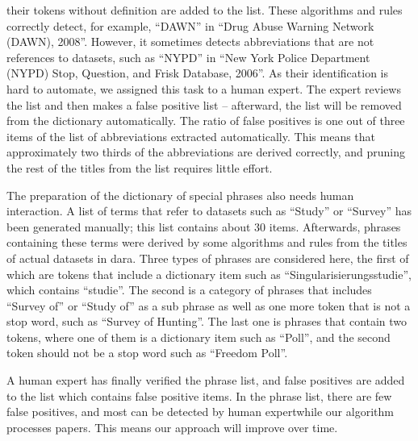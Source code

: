 \documentclass{IOS-Book-Article}
\newcommand{\dara}{\textsf{da\textbar ra}}
\begin{document}
their tokens without definition are added to the list.
These algorithms and rules correctly detect, for example, \enquote{DAWN} in \enquote{Drug Abuse Warning Network (DAWN), 2008}.
However, it sometimes detects abbreviations that are not references to datasets, such as \enquote{NYPD} in \enquote{New York Police Department (NYPD) Stop, Question, and Frisk Database, 2006}.
As their identification is hard to automate, we assigned this task to a human expert. 
The expert reviews the list and then makes a false positive list -- afterward, the list will be removed from the dictionary automatically. The ratio of false positives is one out of three items of the list of abbreviations extracted automatically.
This means that approximately two thirds of the abbreviations are derived correctly, and pruning the rest of the titles from the list requires little effort.

The preparation of the dictionary of special phrases also needs human interaction.
A list of terms that refer to datasets such as \enquote{Study} or \enquote{Survey} has been generated manually; this list contains about 30 items.
Afterwards, phrases containing these terms were derived by some algorithms and rules from the titles of actual datasets in {\dara}.
Three types of phrases are considered here, the first of which are tokens that include a dictionary item such as \enquote{Singularisierungsstudie}, which contains \enquote{studie}.
The second is a category of phrases that includes \enquote{Survey of} or \enquote{Study of} as a sub phrase as well as one more token that is not a stop word, such as \enquote{Survey of Hunting}.
The last one is phrases that contain two tokens, where one of them is a dictionary item such as \enquote{Poll}, and the second token should not be a stop word such as \enquote{Freedom Poll}. 

A human expert has finally verified the phrase list, and false positives are added to the list which contains false positive items.
In the phrase list, there are few false positives, and most can be detected by human expertwhile our algorithm processes papers.
This means our approach will improve over time.
 
\end{document}
